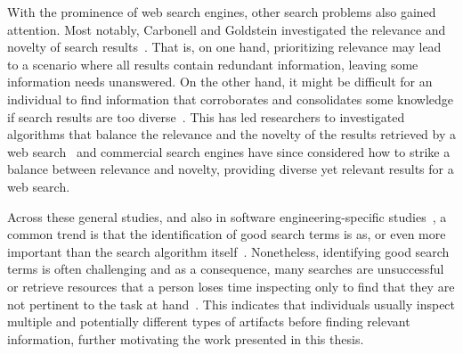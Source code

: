 With the prominence of web search engines, other search problems also gained attention.
Most notably,  Carbonell and Goldstein investigated the relevance and novelty of search results~\cite{Carbonell1998}.
That is, on one hand, prioritizing relevance may lead to a scenario where all results contain redundant information, leaving some information needs unanswered. 
On the other hand, it might be difficult for an individual 
to find information that corroborates and consolidates some knowledge if search results  are too diverse~\cite{clark2013relevance}.  
This has led researchers to investigated 
algorithms that balance the relevance and the novelty of the results retrieved
by a web search~\cite{najork2001, rafiei2010, vieira2011}
and commercial search engines have since considered how to strike a balance
between relevance and novelty, providing diverse  
yet relevant results for a web search.





Across these general studies, and also in software engineering-specific studies~\cite{Starke2009, Brandt2009a, DeGraaf2014},
a common trend is that the identification of good search terms is as, or even more
important than the search algorithm itself~\cite{Kevic2014}. 
Nonetheless, identifying good search terms is often challenging and 
as a consequence, many searches are unsuccessful or retrieve resources that 
a person loses time inspecting only to find that they are not pertinent to the task at hand~\cite{novotny2004don, Haiduc2013}.
This indicates that individuals usually inspect multiple and potentially different types of artifacts 
before finding relevant information, further motivating
the work presented in this thesis.





